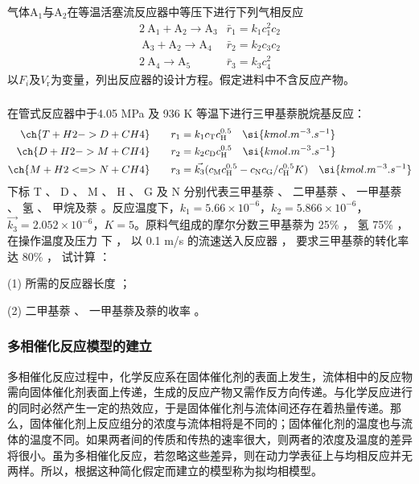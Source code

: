 \begin{frame}[t]
    \frametitle{}

    \begin{example}
        气体A$_1$与A$_2$在等温活塞流反应器中等压下进行下列气相反应
        \[\begin{array}{ll}
            2 \mathrm{~A}_{1}+\mathrm{A}_{2} \longrightarrow \mathrm{A}_{3} & \bar{r}_1=k_{1} c_{1}^{2} c_{2} \\
            \mathrm{~A}_{3}+\mathrm{A}_{2} \longrightarrow \mathrm{A}_{4} & \bar{r}_2=k_{2} c_{3} c_{2} \\
            2 \mathrm{~A}_{4} \longrightarrow \mathrm{A}_{5} & \bar{r}_3=k_{3} c_{4}^{2}
            \end{array}
        \]
        以$F_i$及$V_\mathrm{r}$为变量，列出反应器的设计方程。假定进料中不含反应产物。
    \end{example}

\end{frame}


\begin{frame}[t]
    \frametitle{}
    \begin{example}
        在管式反应器中于4.05 MPa 及 936 K 等温下进行三甲基萘脱烷基反应：
        \[
            \begin{aligned}
                \ch{T + H2 -> D + CH4}  \qquad r_1 &= k_1c_\mathrm{T}c_\mathrm{H}^{0.5} \quad \si{kmol.m^{-3}.s^{-1}}\\
                \ch{D + H2 -> M + CH4}  \qquad r_2 &= k_2c_\mathrm{D}c_\mathrm{H}^{0.5} \quad \si{kmol.m^{-3}.s^{-1}}\\
                \ch{M + H2 <=> N + CH4}  \qquad r_3 &= \vec{k_3}(c_\mathrm{M}c_\mathrm{H}^{0.5}-c_\mathrm{N}c_\mathrm{G}/c_\mathrm{H}^{0.5}K) \quad \si{kmol.m^{-3}.s^{-1}}
            \end{aligned}
        \]
        下标 T 、 D 、 M 、 H 、 G 及 N 分别代表三甲基萘 、 二甲基萘 、 一甲基萘 、 氢 、 甲烷及萘 。反应温度下，$k_1=5.66\times 10^{-6}$，$k_2=5.866\times 10^{-6}$，$\vec{k_3}=2.052\times 10^{-6}$，$K=5$。原料气组成的摩尔分数三甲基萘为 25\% ， 氢 75\% ， 在操作温度及压力
        下 ， 以 0.1 m/s 的流速送入反应器 ， 要求三甲基萘的转化率达 80\% ， 试计算 ：
        
        (1) 所需的反应器长度 ；
        
        (2) 二甲基萘 、 一甲基萘及萘的收率 。
    \end{example}
\end{frame}


\begin{frame}
    \frametitle{多相催化反应模型的建立}

    多相催化反应过程中，化学反应系在固体催化剂的表面上发生，流体相中的反应物需向固体催化剂表面上传递，生成的反应产物又需作反方向传递。与化学反应进行的同时必然产生一定的热效应，于是固体催化剂与流体间还存在着热量传递。那么，固体催化剂上反应组分的浓度与流体相将是不同的；固体催化剂的温度也与流体的温度不同。如果两者间的传质和传热的速率很大，则两者的浓度及温度的差异将很小。虽为多相催化反应，若忽略这些差异，则在动力学表征上与均相反应并无两样。所以，根据这种简化假定而建立的模型称为拟均相模型。

\end{frame}


